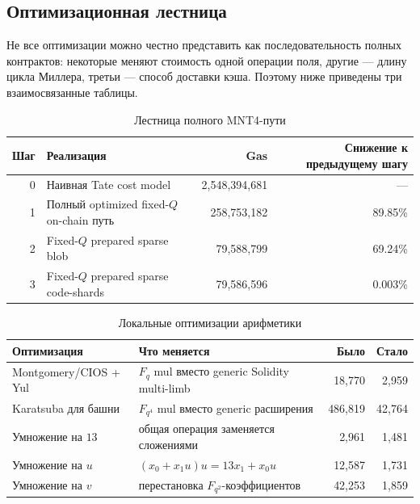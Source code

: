 \documentclass[12pt,a4paper]{article}
\begin{document}
\subsection{Оптимизационная лестница}

Не все оптимизации можно честно представить как последовательность полных
контрактов: некоторые меняют стоимость одной операции поля, другие ---
длину цикла Миллера, третьи --- способ доставки кэша. Поэтому ниже приведены
три взаимосвязанные таблицы.

\begin{table}[htbp]
\centering
\caption{Лестница полного MNT4-пути}
\small
\begin{tabularx}{\linewidth}{r Y r r}
\toprule
Шаг & Реализация & Gas & Снижение к предыдущему шагу \\
 & Наивная Tate cost model & 2,548,394,681 & --- \\
1 & Полный optimized fixed-$Q$ on-chain путь & 258,753,182 & 89.85\% \\
2 & Fixed-$Q$ prepared sparse blob & 79,588,799 & 69.24\% \\
3 & Fixed-$Q$ prepared sparse code-shards & 79,586,596 & 0.003\% \\
\bottomrule
\end{tabularx}
\end{table}

\begin{table}[htbp]
\centering
\caption{Локальные оптимизации арифметики}
\small
\begin{tabularx}{\linewidth}{Y Y r r}
\toprule
Оптимизация & Что меняется & Было & Стало \\
\midrule
Montgomery/CIOS + Yul & $F_q$ mul вместо generic Solidity multi-limb &
18,770 & 2,959 \\
Karatsuba для башни & $F_{q^4}$ mul вместо generic расширения &
486,819 & 42,764 \\
Умножение на $13$ & общая операция заменяется сложениями &
2,961 & 1,481 \\
Умножение на $u$ & $(x_0+x_1u)u=13x_1+x_0u$ &
12,587 & 1,731 \\
Умножение на $v$ & перестановка $F_{q^2}$-коэффициентов &
42,253 & 1,859 \\
\bottomrule
\end{tabularx}
\end{table}
\end{document}
